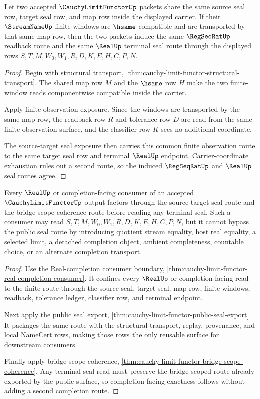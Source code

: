 \begin{theorem}
\label{thm:cauchy-limit-functor-finite-window-naturality}
Let two accepted $\CauchyLimitFunctorUp$ packets share the same source seal row, target seal row, and map row inside the displayed carrier. If their $\StreamNameUp$ finite windows are $\hsame$-compatible and are transported by that same map row, then the two packets induce the same $\RegSeqRatUp$ readback route and the same $\RealUp$ terminal seal route through the displayed rows $S,T,M,W_0,W_1,R,D,K,E,H,C,P,N$.
\end{theorem}
\begin{proof}
Begin with structural transport, \autoref{thm:cauchy-limit-functor-structural-transport}. The shared map row $M$ and the $\hsame$ row $H$ make the two finite-window reads componentwise compatible inside the carrier.

Apply finite observation exposure. Since the windows are transported by the same map row, the readback row $R$ and tolerance row $D$ are read from the same finite observation surface, and the classifier row $K$ sees no additional coordinate.

The source-target seal exposure then carries this common finite observation route to the same target seal row and terminal $\RealUp$ endpoint. Carrier-coordinate exhaustion rules out a second route, so the induced $\RegSeqRatUp$ and $\RealUp$ seal routes agree.
\end{proof}

\begin{theorem}
\label{thm:cauchy-limit-functor-completion-consumer-exactness}
Every $\RealUp$ or completion-facing consumer of an accepted $\CauchyLimitFunctorUp$ output factors through the source-target seal route and the bridge-scope coherence route before reading any terminal seal. Such a consumer may read $S,T,M,W_0,W_1,R,D,K,E,H,C,P,N$, but it cannot bypass the public seal route by introducing quotient stream equality, host real equality, a selected limit, a detached completion object, ambient completeness, countable choice, or an alternate completion transport.
\end{theorem}
\begin{proof}
Use the Real-completion consumer boundary, \autoref{thm:cauchy-limit-functor-real-completion-consumer}. It confines every $\RealUp$ or completion-facing read to the finite route through the source seal, target seal, map row, finite windows, readback, tolerance ledger, classifier row, and terminal endpoint.

Next apply the public seal export, \autoref{thm:cauchy-limit-functor-public-seal-export}. It packages the same route with the structural transport, replay, provenance, and local NameCert rows, making those rows the only reusable surface for downstream consumers.

Finally apply bridge-scope coherence, \autoref{thm:cauchy-limit-functor-bridge-scope-coherence}. Any terminal seal read must preserve the bridge-scoped route already exported by the public surface, so completion-facing exactness follows without adding a second completion route.
\end{proof}

